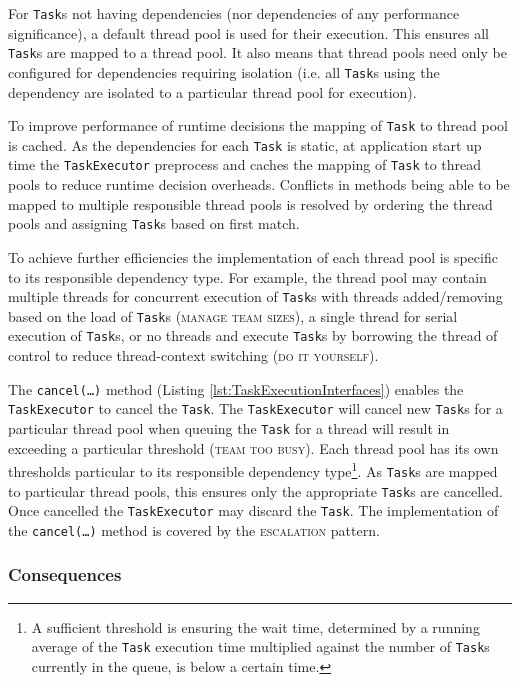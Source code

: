 \documentclass[prodmode]{style/acmlarge}
\begin{document}
For \texttt{Task}s not having dependencies (nor dependencies of any performance
significance), a default thread pool is used for their execution.  This ensures
all \texttt{Task}s are mapped to a thread pool.  It also means that thread pools
need only be configured for dependencies requiring isolation (i.e. all
\texttt{Task}s using the dependency are isolated to a particular thread pool for
execution).

To improve performance of runtime decisions the mapping of \texttt{Task} to
thread pool is cached.  As the dependencies for each \texttt{Task} is static, at
application start up time the \texttt{TaskExecutor} preprocess and caches the
mapping of \texttt{Task} to thread pools to reduce runtime decision overheads.
Conflicts in methods being able to be mapped to multiple responsible thread
pools is resolved by ordering the thread pools and assigning \texttt{Task}s
based on first match.

To achieve further efficiencies the implementation of each thread pool is
specific to its responsible dependency type.  For example, the thread pool may
contain multiple threads for concurrent execution of \texttt{Task}s with threads
added/removing based on the load of \texttt{Task}s (\textsc{manage team sizes}),
a single thread for serial execution of \texttt{Task}s, or no threads and
execute \texttt{Task}s by borrowing the thread of control to reduce
thread-context switching (\textsc{do it yourself}).

The \texttt{cancel(\ldots)} method (Listing \ref{lst:TaskExecutionInterfaces})
enables the \texttt{TaskExecutor} to cancel the \texttt{Task}. The
\texttt{Task\-Executor} will cancel new \texttt{Task}s for a particular thread
pool when queuing the \texttt{Task} for a thread will result in exceeding a
particular threshold (\textsc{team too busy}).  Each thread pool has its own
thresholds particular to its responsible dependency type\footnote{A sufficient
threshold is ensuring the wait time, determined by a running average of the
\texttt{Task} execution time multiplied against the number of \texttt{Task}s
currently in the queue, is below a certain time.}.  As \texttt{Task}s are mapped
to particular thread pools, this ensures only the appropriate \texttt{Task}s are
cancelled.  Once cancelled the \texttt{TaskExecutor} may discard the
\texttt{Task}.  The implementation of the \texttt{can\-cel(\ldots)} method is
covered by the \textsc{escalation} pattern.


\subsubsection*{Consequences}
\end{document}
